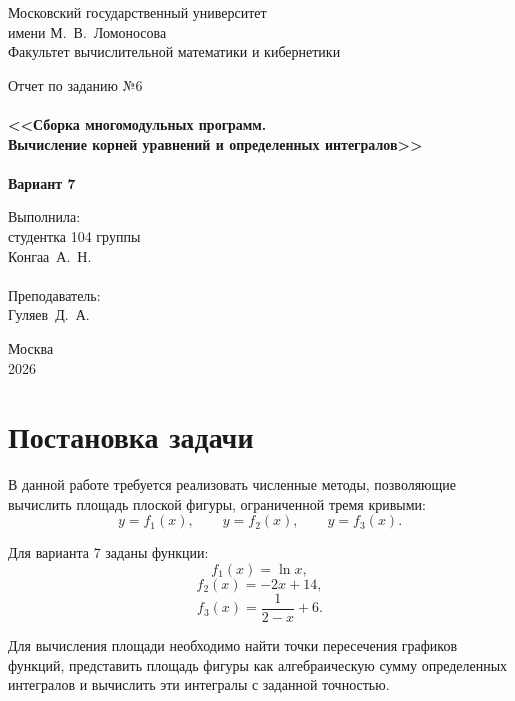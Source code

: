 \documentclass[a4paper,12pt,titlepage,final]{article}
\begin{document}
\begin{titlepage}
    \begin{center}
        {\small \sc Московский государственный университет\\
        имени М.~В.~Ломоносова\\
        Факультет вычислительной математики и кибернетики\\}

        \vfill

        {\Large \sc Отчет по заданию №6}\\
        ~\\
        {\large \bf <<Сборка многомодульных программ.\\
        Вычисление корней уравнений и определенных интегралов>>}\\
        ~\\
        {\large \bf Вариант 7}
    \end{center}

    \begin{flushright}
        \vfill
        {Выполнила:\\
        студентка 104 группы\\
        Конгаа~А.~Н.\\
        ~\\
        Преподаватель:\\
        Гуляев~Д.~А.}
    \end{flushright}

    \begin{center}
        \vfill
        {\small Москва\\2026}
    \end{center}
\end{titlepage}

\tableofcontents
\newpage

\section{Постановка задачи}

В данной работе требуется реализовать численные методы, позволяющие вычислить площадь плоской фигуры, ограниченной тремя кривыми:
\[
    y=f_1(x), \qquad y=f_2(x), \qquad y=f_3(x).
\]

Для варианта 7 заданы функции:
\[
    f_1(x)=\ln x,
\]
\[
    f_2(x)=-2x+14,
\]
\[
    f_3(x)=\frac{1}{2-x}+6.
\]

Для вычисления площади необходимо найти точки пересечения графиков функций, представить площадь фигуры как алгебраическую сумму определенных интегралов и вычислить эти интегралы с заданной точностью.
\end{document}

